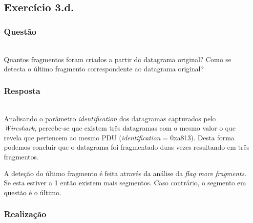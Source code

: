 \documentclass{llncs}
\begin{document}
\subsection{Exercício 3.d.}
\subsubsection{Questão}\rule[-10pt]{0pt}{10pt}\\

Quantos fragmentos foram criados a partir do datagrama original? Como se detecta o último fragmento correspondente ao datagrama original?

\subsubsection{Resposta}\rule[-10pt]{0pt}{10pt}\\

Analisando o parâmetro \textit{identification} dos datagramas capturados pelo \textit{Wireshark}, percebe-se que existem três datagramas com o mesmo valor o que revela que pertencem ao mesmo PDU (\textit{identification} = 0xa813). Desta forma podemos concluir que o datagrama foi fragmentado duas vezes resultando em três fragmentos.
	
A deteção do último fragmento é feita através da análise da \textit{flag more fragments}. Se esta estiver a 1 então existem mais segmentos. Caso contrário, o segmento em questão é o último.

\subsubsection{Realização}\rule[-10pt]{0pt}{10pt}\\
\end{document}
